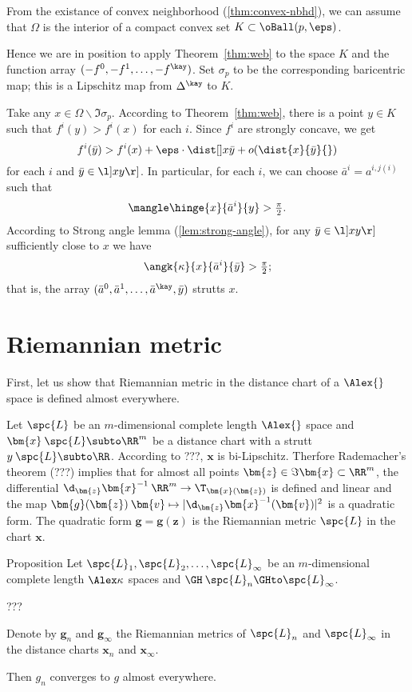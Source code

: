 From the existance of convex neighborhood (\ref{thm:convex-nbhd}),
we can assume that $\Omega$ is the interior of 
a compact convex set $K\subset \oBall(p,\eps)$.

Hence we are in position to apply Theorem~\ref{thm:web} to the space $K$ 
and the function array $(-f^0,-f^1,\dots,-f^\kay)$.
Set $\sigma_p$ to be the corresponding baricentric map;
this is a Lipschitz map from $\Delta^\kay$ to $K$. 

Take any $x\in\Omega\backslash\Im \sigma_p$.
According to Theorem~\ref{thm:web},
there is a point $y\in K$ such that $f^i(y)>f^i(x)$ for each $i$.
Since $f^i$ are strongly concave,
we get 
\[f^i(\bar y)>f^i(x)+\eps\cdot\dist[{{}}]x{\bar y}{}+o(\dist{x}{\bar y}{})\] 
for each $i$ and $\bar y\in \l]xy\r]$.
In particular, for each $i$, 
we can choose $\bar a^i=a^{i,j(i)}$  such that
\[\mangle\hinge{x}{\bar a^i}{y}>\tfrac\pi2.\]
According to Strong angle lemma (\ref{lem:strong-angle}),
for any $\bar y\in\l]xy\r]$ sufficiently close to $x$ we have
\[\angk{\kappa}{x}{\bar a^i}{\bar y}>\tfrac\pi2;\]
that is, the array $(\bar  a^0,\bar  a^1,\dots,\bar  a^\kay,\bar y)$ strutts $x$.
\qeds


\section{Riemannian metric}

First, let us show that Riemannian metric in the distance chart of a $\Alex{}$ space is defined almost everywhere.

Let $\spc{L}$ be an $m$-dimensional complete length $\Alex{}$ space
and $\bm{x}\:\spc{L}\subto\RR^m$ be a distance chart with a strutt $y\:\spc{L}\subto\RR$.
According to ???, $\bm{x}$ is bi-Lipschitz.
Therfore Rademacher's theorem (???) implies that
for almost all points $\bm{z}\in\Im\bm{x}\subset\RR^m$,
the differential 
$\d_{\bm{z}}\bm{x}^{-1}\:\RR^m
\to
\T_{\bm{x}(\bm{z})}$ 
is defined and linear 
and the map $\bm{g}(\bm{z})\:\bm{v}\mapsto|\d_{\bm{z}}\bm{x}^{-1}(\bm{v})|^2$
is a quadratic form.
The quadratic form $\bm{g}=\bm{g}(\bm{z})$ is the Riemannian metric $\spc{L}$ in the chart $\bm{x}$.

\begin{thm}{Proposition}
Let $\spc{L}_1,\spc{L}_2,\dots,\spc{L}_\infty$ be an $m$-dimensional complete length $\Alex\kappa$ spaces
and $\GH\:\spc{L}_n\GHto \spc{L}_\infty$.

???

Denote by $\bm{g}_n$ and $\bm{g}_\infty$ the Riemannian metrics of $\spc{L}_n$ and $\spc{L}_\infty$ in the distance charts $\bm{x}_n$ and $\bm{x}_\infty$.

Then $g_n$ converges to $g$ almost everywhere. 
\end{thm}

